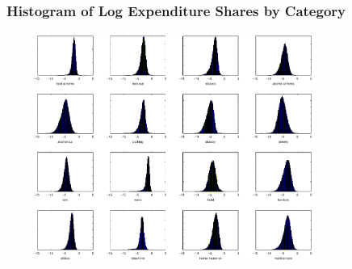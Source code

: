 \documentclass{beamer}
\begin{document}
%
\begin{frame}[label=logn]
  \frametitle{Histogram of Log Expenditure Shares by Category}
  \includegraphics[width=11cm, height=7.5cm]{pics/shrplot_cropped.pdf}

  \hyperlink{comeback}{}
\end{frame}
\end{document}
